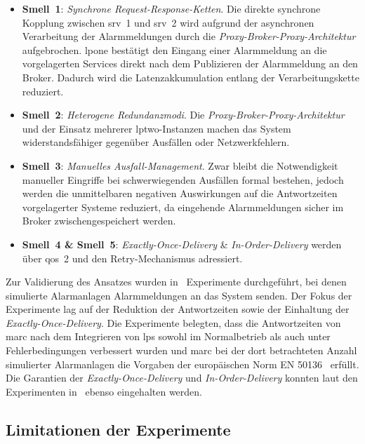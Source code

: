 \begin{itemize}
	\item \textbf{Smell~1}: \textit{Synchrone Request-Response-Ketten}. Die direkte synchrone Kopplung zwischen \gls{srv}~1 und \gls{srv}~2 wird aufgrund der asynchronen Verarbeitung der Alarmmeldungen durch die \textit{Proxy-Broker-Proxy-Archi\-tek\-tur} aufgebrochen. \gls{lpone} bestätigt den Eingang einer Alarmmeldung an die vorgelagerten Services direkt nach dem Publizieren der Alarmmeldung an den Broker. Dadurch wird die Latenzakkumulation entlang der Verarbeitungskette reduziert.

	\item \textbf{Smell~2}: \textit{Heterogene Redundanzmodi}. Die \textit{Proxy-Broker-Proxy-Archi\-tek\-tur} und der Einsatz mehrerer \gls{lptwo}-Instanzen machen das System widerstandsfähiger gegenüber Ausfällen oder Netzwerkfehlern.

	\item \textbf{Smell~3}: \textit{Manuelles Ausfall-Management}. Zwar bleibt die Notwendigkeit manueller Eingriffe bei schwerwiegenden Ausfällen formal bestehen, jedoch werden die unmittelbaren negativen Auswirkungen auf die Antwortzeiten vorgelagerter Systeme reduziert, da eingehende Alarmmeldungen sicher im Broker zwischengespeichert werden.

	\item \textbf{Smell~4 \& Smell~5}: \textit{Exactly-Once-Delivery} \& \textit{In-Order-Delivery} werden über \gls{qos}~2 und den Retry-Mechanismus adressiert.
\end{itemize}

Zur Validierung des Ansatzes wurden in~\citep{liebig_2025_architectural_refactoring} Experimente durch\-ge\-führt, bei denen simulierte Alarmanlagen Alarmmeldungen an das System senden. Der Fokus der Experimente lag auf der Reduktion der Antwortzeiten sowie der Einhaltung der \textit{Exactly-Once-Delivery}. Die Experimente belegten, dass die Antwortzeiten von \gls{marc} nach dem Integrieren von \gls{lps} sowohl im Normalbetrieb als auch unter Fehlerbedingungen verbessert wurden und \gls{marc} bei der dort betrachteten Anzahl simulierter Alarmanlagen die Vorgaben der europäischen Norm EN 50136~\citep{din_en_50136-12012-08_alarm_2012} erfüllt. Die Garantien der \textit{Exactly-Once-Delivery} und \textit{In-Order-Delivery} konnten laut den Experimenten in~\citep{liebig_2025_architectural_refactoring} ebenso eingehalten werden.

\subsection{Limitationen der Experimente}
\label{sub-sec:lps-limitationen-experimente}

